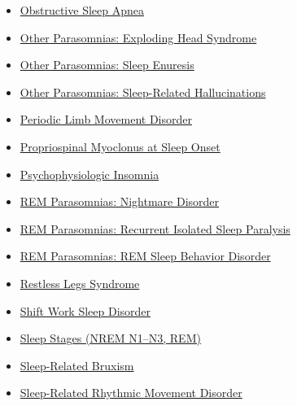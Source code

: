 \begin{itemize}[noitemsep]
  \item \hyperlink{sec:Obstructive Sleep Apnea}{Obstructive Sleep Apnea}
  \item \hyperlink{sec:Exploding Head Syndrome}{Other Parasomnias: Exploding Head Syndrome}
  \item \hyperlink{sec:Sleep Enuresis}{Other Parasomnias: Sleep Enuresis}
  \item \hyperlink{sec:Sleep-Related Hallucinations}{Other Parasomnias: Sleep-Related Hallucinations}
  \item \hyperlink{sec:Periodic Limb Movement Disorder}{Periodic Limb Movement Disorder}
  \item \hyperlink{sec:Propriospinal Myoclonus at Sleep Onset}{Propriospinal Myoclonus at Sleep Onset}
  \item \hyperlink{sec:Psychophysiologic Insomnia}{Psychophysiologic Insomnia}
  \item \hyperlink{sec:Nightmare Disorder}{REM Parasomnias: Nightmare Disorder}
  \item \hyperlink{sec:Recurrent Isolated Sleep Paralysis}{REM Parasomnias: Recurrent Isolated Sleep Paralysis}
  \item \hyperlink{sec:REM Sleep Behavior Disorder}{REM Parasomnias: REM Sleep Behavior Disorder}
  \item \hyperlink{sec:Restless Legs Syndrome}{Restless Legs Syndrome}
  \item \hyperlink{sec:Shift Work Sleep Disorder}{Shift Work Sleep Disorder}
  \item \hyperlink{sec:Sleep Stages}{Sleep Stages (NREM N1--N3, REM)}
  \item \hyperlink{sec:Sleep-Related Bruxism}{Sleep-Related Bruxism}
  \item \hyperlink{sec:Sleep-Related Rhythmic Movement Disorder}{Sleep-Related Rhythmic Movement Disorder}
\end{itemize}

